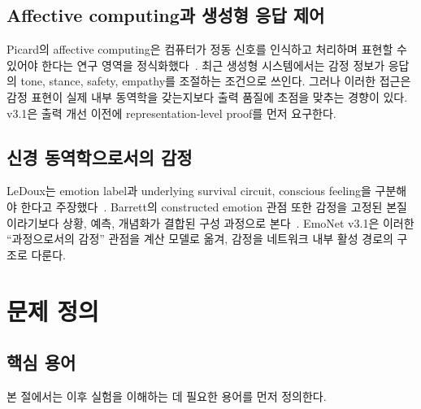 \documentclass[11pt,a4paper]{article}
\begin{document}
\subsection{Affective computing과 생성형 응답 제어}

Picard의 affective computing은 컴퓨터가 정동 신호를 인식하고 처리하며 표현할 수 있어야 한다는 연구 영역을 정식화했다~\cite{picard1997affective}. 최근 생성형 시스템에서는 감정 정보가 응답의 tone, stance, safety, empathy를 조절하는 조건으로 쓰인다. 그러나 이러한 접근은 감정 표현이 실제 내부 동역학을 갖는지보다 출력 품질에 초점을 맞추는 경향이 있다. v3.1은 출력 개선 이전에 representation-level proof를 먼저 요구한다.

\subsection{신경 동역학으로서의 감정}

LeDoux는 emotion label과 underlying survival circuit, conscious feeling을 구분해야 한다고 주장했다~\cite{ledoux2012rethinking}. Barrett의 constructed emotion 관점 또한 감정을 고정된 본질이라기보다 상황, 예측, 개념화가 결합된 구성 과정으로 본다~\cite{barrett2017constructed}. EmoNet v3.1은 이러한 ``과정으로서의 감정'' 관점을 계산 모델로 옮겨, 감정을 네트워크 내부 활성 경로의 구조로 다룬다.

\section{문제 정의}

\subsection{핵심 용어}

본 절에서는 이후 실험을 이해하는 데 필요한 용어를 먼저 정의한다.
\end{document}
